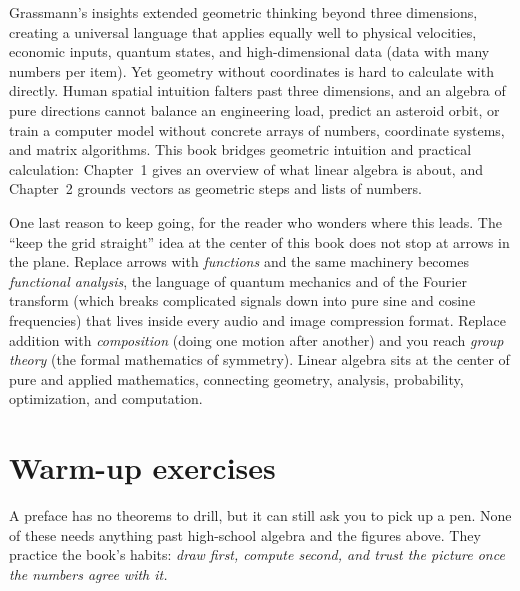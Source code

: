 \begin{historybox}
Grassmann's insights extended geometric thinking beyond three dimensions, creating
a universal language that applies equally well to physical velocities, economic inputs,
quantum states, and high-dimensional data (data with many numbers per item). Yet geometry
without coordinates is hard to calculate with directly. Human spatial intuition falters past
three dimensions, and an algebra of pure directions cannot balance an engineering load, predict
an asteroid orbit, or train a computer model without concrete arrays of numbers, coordinate
systems, and matrix algorithms. This book bridges geometric intuition and practical calculation:
Chapter~1 gives an overview of what linear algebra is
about, and Chapter~2 grounds vectors as geometric steps and lists of numbers.
\end{historybox}

\begin{connectionbox}
One last reason to keep going, for the reader who wonders where this leads. The
``keep the grid straight'' idea at the center of this book does not stop at arrows
in the plane. Replace arrows with \emph{functions} and the same machinery becomes
\emph{functional analysis}, the language of quantum mechanics and of the Fourier
transform (which breaks complicated signals down into pure sine and cosine frequencies)
that lives inside every audio and image compression format. Replace addition with \emph{composition}
(doing one motion after another) and you reach \emph{group theory} (the formal mathematics of symmetry).
Linear algebra sits at the center of pure and applied mathematics, connecting geometry,
analysis, probability, optimization, and computation.
\end{connectionbox}

\section*{Warm-up exercises}

A preface has no theorems to drill, but it can still ask you to pick up a pen.
None of these needs anything past high-school algebra and the figures above.
They practice the book's habits: \emph{draw first, compute second, and trust the
picture once the numbers agree with it.}

